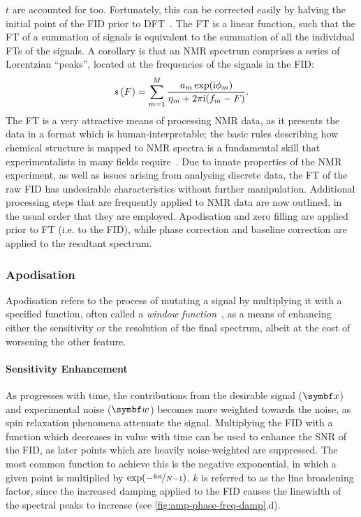 $t$ are accounted for too. Fortunately, this can be corrected easily by
halving the initial point of the \ac{FID} prior to \ac{DFT}~\cite{Tang1994}.
The \ac{FT} is a linear function, such that the
\ac{FT} of a summation of signals is equivalent to the summation of all
the individual \ac{FT}s of the signals. A corollary is that an \ac{NMR}
spectrum comprises a series of Lorentzian ``peaks'', located at the frequencies
of the signals in the \ac{FID}:
\begin{equation}
    s\left(F\right) = \sum_{m=1}^{M}
    \frac{\amexpphim}
    {\eta_m + 2 \pi \iu (f_m - F)}.
    \label{eq:ft-summation}%
\end{equation}
The \ac{FT} is a very attractive means of processing \ac{NMR} data, as it
presents the data in a format which is human-interpretable; the basic
rules describing how chemical structure is mapped to \ac{NMR} spectra
is a fundamental skill that experimentalists in many fields
require~\cite{Hore2015b}.
Due to innate properties of the \ac{NMR} experiment,
as well as issues arising from analysing discrete data, the \ac{FT} of
the raw \ac{FID} has undesirable
characteristics without further manipulation. Additional processing
steps that are frequently applied to \ac{NMR} data are now outlined, in the
usual order that they are employed. Apodisation and zero filling
are applied prior to \ac{FT} (i.e. to the \ac{FID}), while phase
correction and baseline correction are applied to the resultant spectrum.

\subsubsection{Apodisation}
Apodisation refers to the process of mutating a signal by multiplying it with a
specified function, often called a \emph{window function}~\cite[Section
3.2.7]{Claridge2016}, as a means of enhancing either the sensitivity or the
resolution of the final spectrum, albeit at the cost of worsening the other
feature.

\paragraph{Sensitivity Enhancement} As  progresses with time, the
contributions from the desirable signal ($\bx$) and experimental noise ($\bw$)
becomes more weighted towards the noise, as spin relaxation phenomena attenuate
the signal.  Multiplying the \ac{FID} with a function which decreases in value
with time can be used to enhance the \ac{SNR} of the \ac{FID}, as later points
which are heavily noise-weighted are suppressed. The most common function to
achieve this is the negative exponential, in which a given point is multiplied
by $\exp(-\nicefrac{k n}{N - 1})$.  $k$ is referred to as the line broadening
factor, since the increased damping applied to the \ac{FID} causes the
linewidth of the spectral peaks to increase (see
\cref{fig:amp-phase-freq-damp}.d).

